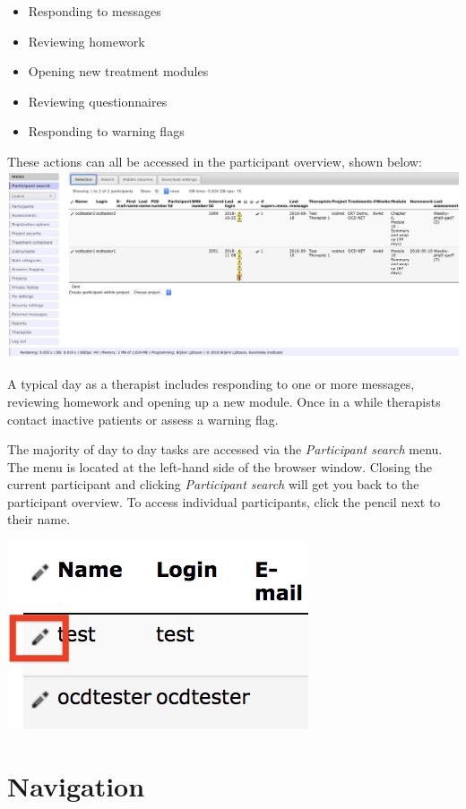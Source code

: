 \documentclass[]{book}
\providecommand{\tightlist}{%
  \setlength{\itemsep}{0pt}\setlength{\parskip}{0pt}}
\begin{document}
\begin{itemize}
\tightlist
\item
  Responding to messages
\item
  Reviewing homework
\item
  Opening new treatment modules
\item
  Reviewing questionnaires
\item
  Responding to warning flags
\end{itemize}

These actions can all be accessed in the participant overview, shown below:
\includegraphics{images/participant-overview.png}

A typical day as a therapist includes responding to one or more messages, reviewing homework and opening up a new module. Once in a while therapists contact inactive patients or assess a warning flag.

The majority of day to day tasks are accessed via the \emph{Participant search} menu. The menu is located at the left-hand side of the browser window. Closing the current participant and clicking \emph{Participant search} will get you back to the participant overview. To access individual participants, click the pencil next to their name.

\includegraphics{images/pencil.png}

\hypertarget{navigation}{%
\section{Navigation}\label{navigation}}
\end{document}

